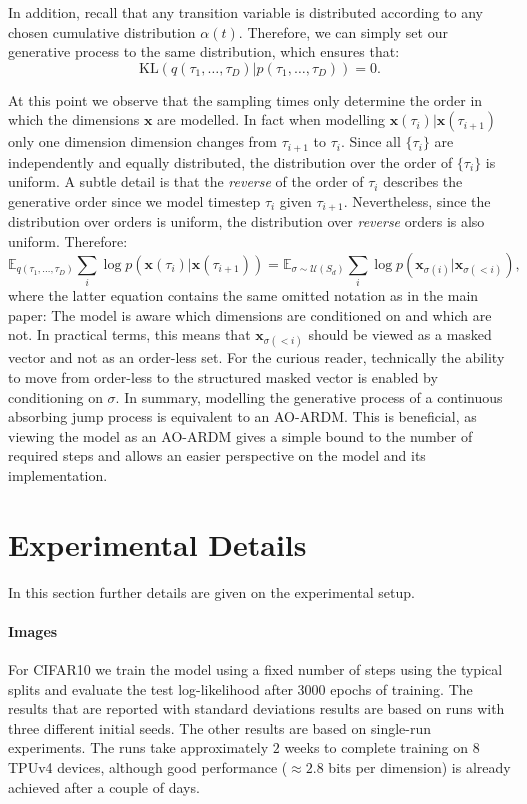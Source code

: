 \documentclass{article} \usepackage{iclr2022_conference,times}
\def\vx{{\bm{x}}}
\begin{document}
In addition, recall that any transition variable is distributed according to any chosen cumulative distribution $\alpha(t)$. Therefore, we can simply set our generative process to the same distribution, which ensures that:
$$\mathrm{KL}(q(\tau_1, \ldots, \tau_D) | p(\tau_1, \ldots, \tau_D)) = 0.$$


At this point we observe that the sampling times only determine the order in which the dimensions $\vx$ are modelled. In fact when modelling $\vx(\tau_{i})|\vx(\tau_{i+1})$ only one dimension dimension changes from $\tau_{i+1}$ to $\tau_i$. Since all $\{\tau_i\}$ are independently and equally distributed, the distribution over the order of $\{\tau_i\}$ is uniform. A subtle detail is that the \textit{reverse} of the order of $\tau_i$ describes the generative order since we model timestep $\tau_i$ given $\tau_{i+1}$. Nevertheless, since the distribution over orders is uniform, the distribution over \textit{reverse} orders is also uniform. Therefore:
$$\mathbb{E}_{q(\tau_1, \ldots, \tau_D)} \sum_{i} \log p(\vx(\tau_{i})|\vx(\tau_{i+1})) =  \mathbb{E}_{\sigma \sim \mathcal{U}(S_d)} \sum_{i} \log p(\mathbf{x}_{\sigma(i)}|\vx_{\sigma(<i)}),$$
where the latter equation contains the same omitted notation as in the main paper: The model is aware which dimensions are conditioned on and which are not. In practical terms, this means that $\vx_{\sigma(<i)}$ should be viewed as a masked vector and not as an order-less set. For the curious reader, technically the ability to move from order-less to the structured masked vector is enabled by conditioning on $\sigma$. In summary, modelling the generative process of a continuous absorbing jump process is equivalent to an AO-ARDM. This is beneficial, as viewing the model as an AO-ARDM gives a simple bound to the number of required steps and allows an easier perspective on the model and its implementation.
 
\section{Experimental Details}
\label{app:experimental_details}

In this section further details are given on the experimental setup.

\paragraph{Images}
For CIFAR10 \citep{krizhevsky2009learning} we train the model using a fixed number of steps using the typical splits and evaluate the test log-likelihood after $3000$ epochs of training. The results that are reported with standard deviations results are based on runs with three different initial seeds. The other results are based on single-run experiments. The runs take approximately $2$ weeks to complete training on 8 TPUv4 devices, although good performance ($\approx \! 2.8$ bits per dimension) is already achieved after a couple of days.
\end{document}
